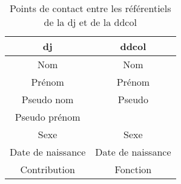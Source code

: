 \begin{table}[!h]
	\centering
	\begin{tabular}{|c|c|}
		\hline
		\textbf{\ac{dj}} & \textbf{\ac{ddcol}}\\ \hline
		Nom&Nom\\ \hline
		Prénom&Prénom\\ \hline
		Pseudo nom&Pseudo\\ \hline
		Pseudo prénom&\\ \hline
		Sexe&Sexe\\ \hline
		Date de naissance&Date de naissance\\ \hline
		Contribution&Fonction\\ \hline
	\end{tabular}
	\caption[Points de contact entre les référentiels de la \ac{dj} et de la \ac{ddcol}]{Points de contact entre les référentiels de la \ac{dj} et de la \ac{ddcol}}
	\label{table_contact_dj_ddcol}
\end{table}
